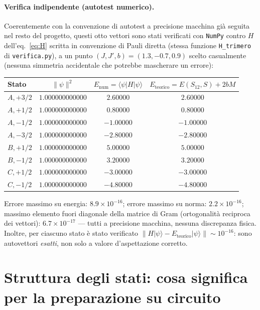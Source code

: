 \documentclass[11pt,a4paper]{article}
\newcommand{\ket}[1]{\lvert #1\rangle}
\newcommand{\bra}[1]{\langle #1\rvert}
\begin{document}
\paragraph{Verifica indipendente (autotest numerico).} Coerentemente con la
convenzione di autotest a precisione macchina già seguita nel resto del
progetto, questi otto vettori sono stati verificati con \texttt{NumPy} contro
$H$ dell'eq.~\eqref{eq:H} scritta in convenzione di Pauli diretta (stessa
funzione \texttt{H\_trimero} di \texttt{verifica.py}), a un punto
$(J,J',b)=(1.3,-0.7,0.9)$ scelto casualmente (nessuna simmetria accidentale
che potrebbe mascherare un errore):
\begin{center}
\small
\begin{tabular}{lccc}
\toprule
Stato & $\lVert\psi\rVert^2$ & $E_\text{num}=\bra\psi H\ket\psi$ & $E_\text{teorico}=E(S_{12},S)+2bM$\\
\midrule
$A,{+}3/2$ & $1.000000000000$ & $2.60000$ & $2.60000$ \\
$A,{+}1/2$ & $1.000000000000$ & $0.80000$ & $0.80000$ \\
$A,{-}1/2$ & $1.000000000000$ & $-1.00000$ & $-1.00000$ \\
$A,{-}3/2$ & $1.000000000000$ & $-2.80000$ & $-2.80000$ \\
$B,{+}1/2$ & $1.000000000000$ & $5.00000$ & $5.00000$ \\
$B,{-}1/2$ & $1.000000000000$ & $3.20000$ & $3.20000$ \\
$C,{+}1/2$ & $1.000000000000$ & $-3.00000$ & $-3.00000$ \\
$C,{-}1/2$ & $1.000000000000$ & $-4.80000$ & $-4.80000$ \\
\bottomrule
\end{tabular}
\end{center}
Errore massimo su energia: $8.9\times10^{-16}$; errore massimo su norma:
$2.2\times10^{-16}$; massimo elemento fuori diagonale della matrice di Gram
(ortogonalità reciproca dei vettori): $6.7\times10^{-17}$ — tutti a
precisione macchina, nessuna discrepanza fisica. Inoltre, per ciascuno stato
è stato verificato $\lVert H\ket\psi - E_\text{teorico}\ket\psi\rVert\sim10^{-16}$:
sono autovettori \emph{esatti}, non solo a valore d'aspettazione corretto.

\section{Struttura degli stati: cosa significa per la preparazione su circuito}
\end{document}
